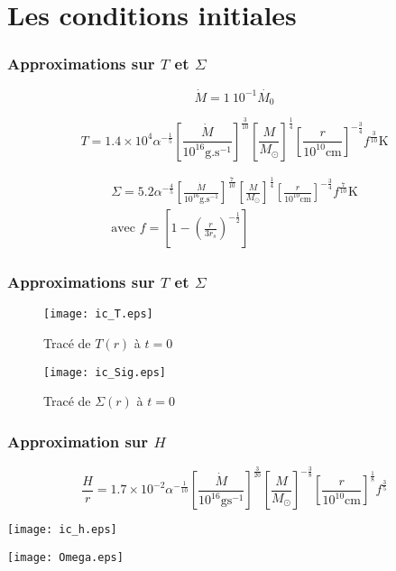 \section{Les conditions initiales}
\begin{frame}
\frametitle{Approximations sur $T$ et $\Sigma$}
\begin{equation*}
	\dot{M} = 1\ 10^{-1 }\dot{M_{0}}
\end{equation*} 

	\begin{equation*}
	T = 1.4 \times 10^{4} \alpha^{- \frac{1}{5}} \left[ \frac{\dot{M}}{10^{16} \mathrm{g.s}^{-1}} \right]^{\frac{3}{10}} \left[ \frac{M}{M_\odot}\right]^{\frac{1}{4}} \left[ \frac{r}{10^{10}\mathrm{cm}}\right]^{- \frac{3}{4}} f^{\frac{3}{10}} \mathrm{K} 
\end{equation*}

\begin{equation*}
	\begin{aligned}
		\Sigma = 5.2 \alpha^{- \frac{4}{5}} \left[ \frac{\dot{M}}{10^{16} \mathrm{g.s}^{-1}} \right]^{\frac{7}{10}} \left[ \frac{M}{M_\odot}\right]^{\frac{1}{4}} \left[ \frac{r}{10^{10} \mathrm{cm}}\right]^{- \frac{3}{4}} f^{\frac{7}{10}} \mbox{K}  \\ 
	\text{avec } f = \left[ 1 - \left( \frac{r}{3 r_{s}}\right)^{- \frac{1}{2}}\right]
		\end{aligned}
\end{equation*}
\end{frame}

\begin{frame}
\frametitle{Approximations sur $T$ et $\Sigma$}
 \begin{figure}[ht]
   \begin{minipage}[c]{.46\linewidth}
      \texttt{[image: ic\_T.eps]}
      \caption{Tracé de $T(r)$ à $t = 0$}
   \end{minipage} \hfill
   \begin{minipage}[c]{.46\linewidth}
      \texttt{[image: ic\_Sig.eps]}
      \caption{Tracé de $\Sigma(r)$ à $t = 0$}
   \end{minipage}
\end{figure} 
\end{frame}

\begin{frame}
\frametitle{Approximation sur $H$}
	\begin{equation*}
	\frac{H}{r} = 1.7 \times 10^{-2}\alpha^{- \frac{1}{10}} \left[ \frac{\dot{M}}{10^{16} \mbox{g} \mbox{s}^{-1}} \right]^{\frac{3}{20}} \left[ \frac{M}{M_\odot}\right]^{- \frac{3}{8}} \left[ \frac{r}{10^{10} \mathrm{cm}}\right]^{\frac{1}{8}} f^{\frac{3}{5}}
\end{equation*}
\end{frame}

\begin{frame}
	\begin{center}
		\texttt{[image: ic\_h.eps]}
	\end{center}
\end{frame}

\begin{frame}
	\begin{center}
		\texttt{[image: Omega.eps]}
	\end{center}
\end{frame}